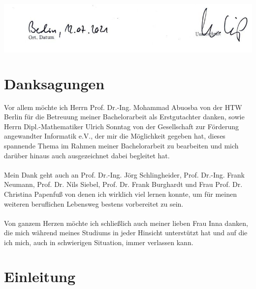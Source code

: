 \documentclass[
fontsize=10pt, 
listof = totoc,
parskip = half	
]{report}
\begin{document}
\vspace{4cm}

\includegraphics[width=\textwidth, height=\textheight, keepaspectratio]{pics/signature}

\newpage\null\thispagestyle{empty}\newpage

\chapter*{\centering Danksagungen}

Vor allem möchte ich Herrn Prof. Dr.-Ing. Mohammad Abuosba von der HTW Berlin für die Betreuung meiner Bachelorarbeit als Erstgutachter danken, sowie Herrn Dipl.-Mathematiker Ulrich Sonntag von der Gesellschaft zur Förderung angewandter Informatik e.V., der mir die Möglichkeit gegeben hat, dieses spannende Thema im Rahmen meiner Bachelorarbeit zu bearbeiten und mich darüber hinaus auch ausgezeichnet dabei begleitet hat. 
\\\\
\noindent Mein Dank geht auch an Prof. Dr.-Ing. Jörg Schlingheider, Prof. Dr.-Ing. Frank Neumann, Prof. Dr. Nils Siebel, Prof. Dr. Frank Burghardt und Frau Prof. Dr. Christina Papenfuß von denen ich wirklich viel lernen konnte, um für meinen weiteren beruflichen Lebensweg bestens vorbereitet zu sein.
\\\\
\noindent Von ganzem Herzen möchte ich schließlich auch meiner lieben Frau Inna danken, die mich während meines Studiums in jeder Hinsicht unterstützt hat und auf die ich mich, auch in schwierigen Situation, immer verlassen kann.

\newpage\null\thispagestyle{empty} 

\newpage
\tableofcontents
\newpage
{}
\listoffigures
{}
\newpage
\listoftables
{}
\newpage
{}
\newpage

\chapter{Einleitung}
\label{ch:Einleitung}
\end{document}
